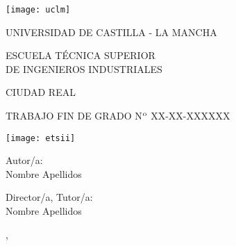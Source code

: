 
\begin{titlepage}
\begin{center}
\texttt{[image: uclm]}
\bigskip
\medskip

\fontsize{17pt}{19pt}
{\selectfont  
UNIVERSIDAD DE CASTILLA - LA MANCHA
} \\ 
\bigskip
\smallskip

{\selectfont ESCUELA TÉCNICA SUPERIOR \\ \medskip
DE INGENIEROS INDUSTRIALES}


\bigskip
\medskip
{}\fontsize{15pt}{17pt}
{\selectfont CIUDAD REAL}

\vspace*{2cm} 

\fontsize{17pt}{19pt}
{\selectfont
TRABAJO FIN DE GRADO N$^{\rm o}$ XX-XX-XXXXXX \\
\bigskip
\bigskip
\bigskip
\makeatletter
\@tituloPrimera
\makeatother
}

\vfill
\noindent\begin{minipage}{0.42\textwidth}
\quad\texttt{[image: etsii]}
\end{minipage}
\begin{minipage}{0.55\textwidth}
  \begin{flushleft}
\fontsize{15pt}{15pt}
{\selectfont
 Autor/a:\\[-.2mm]
Nombre Apellidos

\bigskip
Director/a, Tutor/a:\\[-.2mm]
Nombre Apellidos

\bigskip
\makeatletter
\@mesTF, \@yearTF
\makeatother
}
  \end{flushleft}
\end{minipage}
\end{center}
\end{titlepage}

